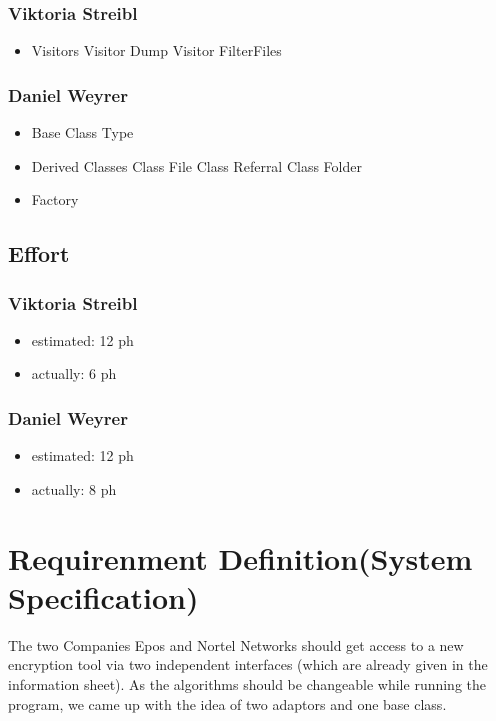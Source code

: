 \subsubsection{Viktoria Streibl}
\begin{itemize}
	\item Visitors
	\subitem Visitor Dump
	\subitem Visitor FilterFiles			
\end{itemize}

\subsubsection{Daniel Weyrer}
\begin{itemize}
	\item Base Class Type
	\item Derived Classes
		\subitem Class File
		\subitem Class Referral
		\subitem Class Folder
	\item Factory
\end{itemize}

\subsection{Effort}

\subsubsection {Viktoria Streibl}
\begin{itemize}
	\item estimated: 12 ph 
	\item actually: 6 ph
\end{itemize}

\subsubsection {Daniel Weyrer}
\begin{itemize}
	\item estimated: 12 ph 
	\item actually: 8 ph
\end{itemize}

\section{Requirenment Definition(System Specification)}
The two Companies Epos and Nortel Networks should get access to a new encryption tool via two independent interfaces (which are already given in the information sheet). As the algorithms should be changeable while running the program, we came up with the idea of two adaptors and one base class.

